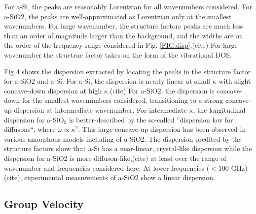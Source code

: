 \documentclass[aps,prb,onecolumn,preprint,superscriptaddress,footinbib,amsmath,amssymb,floatfix]{revtex4}
\begin{document}
For a-Si, the peaks are reasonably Lorentzian for all wavenumbers considered.
\cite{feldman_calculations_2002} 
For a-SiO2, the peaks are well-approximated as Lorentzian only at the 
smallest wavenumbers. For 
large wavenumber, the structure factors peaks are much less than an order 
of magnitude larger than the background, and the widths are on the order 
of the frequency range considered in Fig. \ref{FIG:disp}.(cite) For 
large wavenumber the structrue factor takes on the form of the vibrational 
DOS. 

Fig 4 shows the dispersion extracted by locating the peaks in 
the structure factor for a-SiO2 and a-Si. For a-Si, the dispersion is 
nearly linear at small $\kappa$ with slight concave-down dispersion at 
high $\kappa$.(cite) For a-SiO2, the dispersion is concave-down for 
the smallest wavenumbers considered, transitioning to a strong 
concave-up dispersion at intermediate wavenumber. 
For intermediate $\kappa$, the longitudinal dispersion for a-SiO$_2$ 
is better-described by the so-called 
''dispersion law for diffusons``, where $\omega \propto \kappa^2$.
\cite{beltukov_ioffe-regel_2013} This large concave-up dispersion has been 
observed in various amorphous models\cite{feldman_calculations_2002} 
including of a-SiO2.\cite{ruzicka_evidence_2004} 
The dispersion predited by the structure factors show that a-Si 
has a near-linear, crystal-like dispersion while the dispersion 
for a-SiO2 is more diffuson-like,(cite) at least over the range of 
wavenumber and frequencies considered here.  At lower frequencies 
($< 100$ GHz)(cite), experimental measurements of a-SiO2 show a 
linear dispersion. 

\subsection{\label{S:Structure}Group Velocity}
\end{document}
